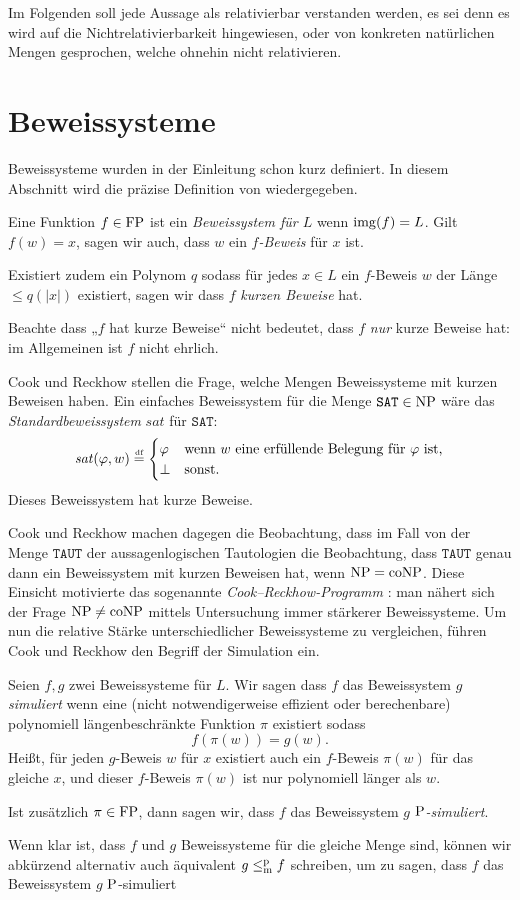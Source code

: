 Im Folgenden soll jede Aussage als relativierbar verstanden werden, es sei denn es wird auf die Nichtrelativierbarkeit hingewiesen, oder von konkreten natürlichen Mengen gesprochen, welche ohnehin nicht relativieren.


\section{Beweissysteme}\label{sec:prelim-ps}

Beweissysteme wurden in der Einleitung schon kurz definiert. In diesem Abschnitt wird die präzise Definition von \textcite{cook_relative_1979} wiedergegeben.
\begin{definition}
Eine Funktion $f\in \FP$ ist ein \emph{Beweissystem für $L$} wenn $\img(f)=L$.
Gilt $f(w)=x$, sagen wir auch, dass $w$ ein \emph{$f$-Beweis} für $x$ ist.

Existiert zudem ein Polynom $q$ sodass für jedes $x\in L$ ein $f$-Beweis $w$ der Länge $\leq q(|x|)$ existiert, sagen wir dass $f$ \emph{kurzen Beweise} hat.
\end{definition}
Beachte dass „$f$ hat kurze Beweise“ nicht bedeutet, dass $f$ \emph{nur} kurze Beweise hat: im Allgemeinen ist $f$ nicht ehrlich.

Cook und Reckhow stellen die Frage, welche Mengen Beweissysteme mit kurzen Beweisen haben.
Ein einfaches Beweissystem für die Menge $\mathtt{SAT}\in\NP$ wäre das \emph{Standardbeweissystem} $\mathit{sat}$ für $\mathtt{SAT}$:
\[ \mathit{sat}(\phi, w) \defeq \begin{cases} \phi & \text{wenn $w$ eine erfüllende Belegung für $\phi$ ist,} \\ \bot & \text{sonst.} \end{cases} \]
Dieses Beweissystem hat kurze Beweise.

Cook und Reckhow machen dagegen die Beobachtung, dass im Fall von der Menge $\mathtt{TAUT}$ der aussagenlogischen Tautologien die Beobachtung, dass $\mathtt{TAUT}$ genau dann ein Beweissystem mit kurzen Beweisen hat, wenn $\NP=\coNP$.
Diese Einsicht motivierte das sogenannte \emph{Cook–Reckhow-Programm} \parencite[vgl.][]{buss_lectures_1996}: man nähert sich der Frage  $\NP\neq \coNP$ mittels Untersuchung immer stärkerer Beweissysteme.
Um nun die relative Stärke unterschiedlicher Beweissysteme zu vergleichen, führen Cook und Reckhow den Begriff der Simulation ein.
\begin{definition}
    Seien $f,g$ zwei Beweissysteme für $L$. Wir sagen dass $f$ das Beweissystem $g$ \emph{simuliert} wenn eine (nicht notwendigerweise effizient oder berechenbare) polynomiell längenbeschränkte Funktion $\pi$  existiert sodass 
    \[ f(\pi(w))=g(w). \]
    Heißt, für jeden $g$-Beweis $w$ für $x$ existiert auch ein $f$-Beweis $\pi(w)$ für das gleiche $x$, und dieser $f$-Beweis $\pi(w)$ ist nur polynomiell länger als $w$.

    Ist zusätzlich $\pi\in\FP$, dann sagen wir, dass $f$ das Beweissystem $g$ \emph{$\P$-simuliert}.
\end{definition}
Wenn klar ist, dass $f$ und $g$ Beweissysteme für die gleiche Menge sind, können wir abkürzend alternativ auch äquivalent $g\leqmp f$ schreiben, um zu sagen, dass $f$ das Beweissystem $g$ $\P$-simuliert

